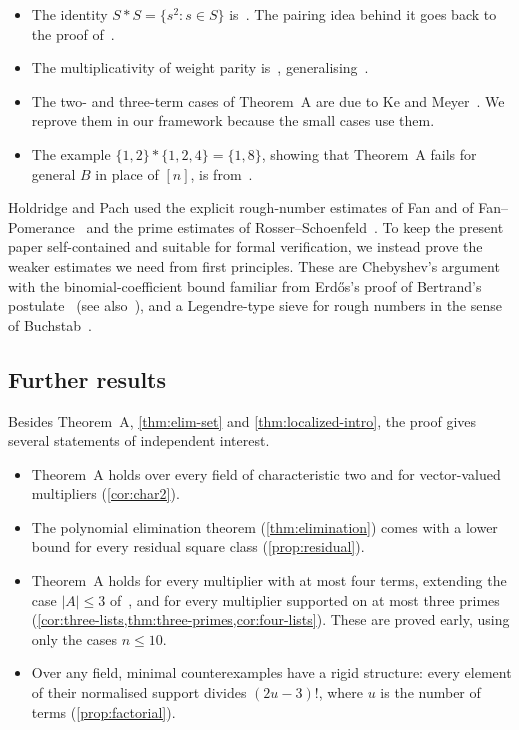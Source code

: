 \begin{itemize}
\item The identity $S*S=\{s^2:s\in S\}$ is~\cite[Lemma~6.2]{HP}. The pairing idea behind it goes back to the proof of~\cite[Theorem~5.1]{KM}.
\item The multiplicativity of weight parity is~\cite[Lemma~3.4]{HP}, generalising~\cite[Lemma~4]{Pilz}.
\item The two- and three-term cases of Theorem~A are due to Ke and Meyer~\cite{KM}. We reprove them in our framework because the small cases use them.
\item The example $\{1,2\}*\{1,2,4\}=\{1,8\}$, showing that Theorem~A fails for general $B$ in place of $[n]$, is from~\cite{HP}.
\end{itemize}
Holdridge and Pach used the explicit rough-number estimates of Fan and of Fan--Pomerance~\cite{Fan,FanPom} and the prime estimates of Rosser--Schoenfeld~\cite{RS}. To keep the present paper self-contained and suitable for formal verification, we instead prove the weaker estimates we need from first principles. These are Chebyshev's argument~\cite{Chebyshev} with the binomial-coefficient bound familiar from Erd\H{o}s's proof of Bertrand's postulate~\cite{Erdos} (see also~\cite{Hanson,Nair}), and a Legendre-type sieve for rough numbers in the sense of Buchstab~\cite{Buchstab}.

\subsection{Further results}
Besides Theorem~A, \cref{thm:elim-set} and \cref{thm:localized-intro}, the proof gives several statements of independent interest.
\begin{itemize}
\item Theorem~A holds over every field of characteristic two and for vector-valued multipliers (\cref{cor:char2}).
\item The polynomial elimination theorem (\cref{thm:elimination}) comes with a lower bound for every residual square class (\cref{prop:residual}).
\item Theorem~A holds for every multiplier with at most four terms, extending the case $|A|\le3$ of~\cite{KM}, and for every multiplier supported on at most three primes (\cref{cor:three-lists,thm:three-primes,cor:four-lists}). These are proved early, using only the cases $n\le10$.
\item Over any field, minimal counterexamples have a rigid structure: every element of their normalised support divides $(2u-3)!$, where $u$ is the number of terms (\cref{prop:factorial}).
\end{itemize}

